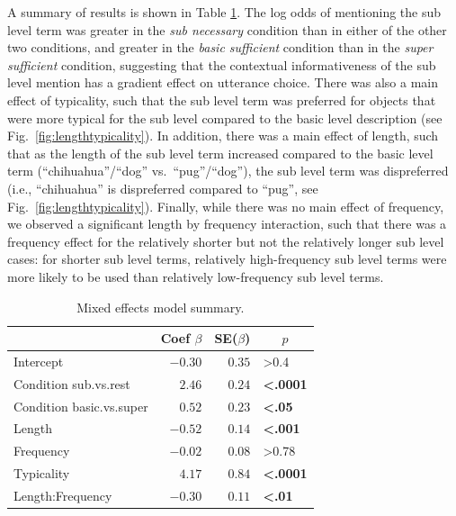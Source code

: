 \documentclass[10pt,letterpaper]{article}
\newcommand{\tableref}[1]{Table \ref{#1}}
\newcommand{\figref}[1]{Fig.~\ref{#1}}
\begin{document}
A summary of results is shown in \tableref{tab:modelresults}. The log odds of mentioning the sub level term was greater in the \emph{sub necessary} condition than in either of the other two conditions, and greater in the \emph{basic sufficient} condition than in the \emph{super sufficient} condition, suggesting that the contextual informativeness of the sub level mention has a gradient effect on utterance choice. There was also a main effect of typicality, such that the sub level term was preferred for objects that were more typical for the sub level compared to the basic level  description (see \figref{fig:lengthtypicality}). In addition, there was a main effect of length, such that as the length of the sub level term increased compared to the basic level term (``chihuahua''/``dog'' vs.~``pug''/``dog''), the sub level term was dispreferred (i.e., ``chihuahua'' is dispreferred compared to ``pug'', see \figref{fig:lengthtypicality}). Finally, while there was no main effect of frequency, we observed a significant length by frequency interaction, such that there was a frequency effect for the relatively shorter but not the relatively longer sub level cases: for shorter sub level terms, relatively high-frequency sub level terms were more likely to be used than relatively low-frequency sub level terms. 

\begin{table}[!tbp]
\caption{Mixed effects model summary.}
\begin{center}
\begin{tabular}{lrrl}
\toprule
\multicolumn{1}{l}{}&\multicolumn{1}{c}{Coef $\beta$}&\multicolumn{1}{c}{SE($\beta$)}&\multicolumn{1}{c}{$p$}\tabularnewline
\midrule
Intercept&$-0.30$&$0.35$&\textgreater0.4\tabularnewline
Condition sub.vs.rest&$ 2.46$&$0.24$&\textbf{\textless.0001}\tabularnewline
Condition basic.vs.super&$ 0.52$&$0.23$&\textbf{\textless.05}\tabularnewline
Length&$-0.52$&$0.14$&\textbf{\textless.001}\tabularnewline
Frequency&$-0.02$&$0.08$&\textgreater0.78\tabularnewline
Typicality&$ 4.17$&$0.84$&\textbf{\textless.0001}\tabularnewline
Length:Frequency&$-0.30$&$0.11$&\textbf{\textless.01}\tabularnewline
\bottomrule
\end{tabular}\end{center}
\label{tab:modelresults}
\end{table}
\end{document}
